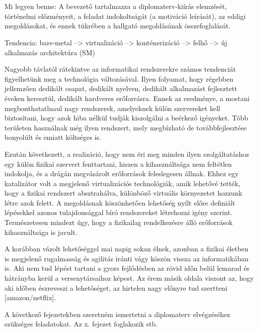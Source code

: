\chapter{\bevezetes}

Mi legyen benne:
A bevezető tartalmazza a diplomaterv-kiírás elemzését, történelmi előzményeit, a feladat indokoltságát (a motiváció leírását), az eddigi megoldásokat, és ennek tükrében a hallgató megoldásának összefoglalását.

Tendencia: bare-metal --> virtualizáció --> konténerizáció --> felhő --> új alkalmazás architektúra (SM) 

Nagyobb távlatól rátekintve az informatikai rendszerekre számos tendenciát figyelhetünk meg a technológia változásával. Ilyen folyamat, hogy régebben jellemzően dedikált csapat, dedikált nyelven, dedikált alkalmazást fejlesztett éveken keresztül, dedikált hardveres erőforrásra. Ennek az eredménye, a mostani megbonthatatlnaul nagy rendszerek, amelyeknek külön szervereket kell biztosítani, hogy azok hiba nélkül tudják kiszolgálni a beérkező igényeket. Több területen használnak még ilyen rendszert, mely megbízható de továbbfejlesztése bonyolúlt és emiatt költséges is.

Ezután következett, a realizáció, hogy nem éri meg minden ilyen szolgáltatáshoz egy külön fizikai szervert fenttartani, hiszen a kihasználtsága nem feltétlen indokolja, és a drágán megvásárolt erőforrások feleslegesen állnak. Ehhez egy katalizátor volt a megjelenő virtualizációs technológiák, amik lehetővé tették, hogy a fizikai rendszert absztrahálva, különböző virtuális környezetet hozzunk létre azok felett. A megoldásnak köszönhetően lehetőség nyílt előre definiált lépésekkel azonos tulajdonsággal bíró rendszereket létrehozni igény szerint. Természetesen mindezt úgy, hogy a fizikailag rendelkezésre álló erőforrások kihasználtsága is javult.

A korábban vázolt lehetőséggel mai napig sokan élnek, azonban a fizikai életben is megjelenő rugalmasság és agilitás iránti vágy köszön vissza az informatikában is. Aki nem tud lépést tartani a gyors fejlődésben az rövid időn belül lemarad és hátrányba kerül a versenytársaihoz képest. Az érem másik oldala viszont az, hogy aki időben észreveszi a lehetőséget, az hirtelen nagy előnyre tud szertteni [amazon/netflix].


A következő fejezetekben szeretném ismertetni a diplomaterv elvégzéséhez szükséges feladatokat. Az x. fejezet foglakozik stb.